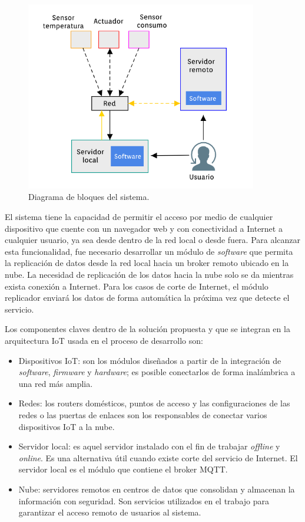 \begin{figure}[htbp]
	\centering
	\includegraphics[width=0.9\textwidth]{./Figures/bloques.png}
	\caption{Diagrama de bloques del sistema.}

	\label{fig:diagrama1}
\end{figure}

El sistema tiene la capacidad de permitir el acceso por medio de cualquier dispositivo que cuente con un navegador web y con conectividad a Internet a cualquier usuario, ya sea desde dentro de la red local o desde fuera. Para alcanzar esta funcionalidad, fue necesario desarrollar un módulo de \emph{software} que permita la replicación de datos desde la red local hacia un broker remoto ubicado en la nube. La necesidad de replicación de los datos hacia la nube solo se da mientras exista conexión a Internet. Para los casos de corte de Internet, el módulo replicador enviará los datos de forma automática la próxima vez que detecte el servicio.%

Los componentes claves dentro de la solución propuesta y que se integran en la arquitectura IoT usada en el proceso de desarrollo son: 


\begin{itemize}
\item Dispositivos IoT: son los módulos diseñados a partir de la integración de \emph{software}, \emph{firmware} y \emph{hardware}; es posible conectarlos de forma inalámbrica a una red más amplia.
\item Redes: los routers domésticos, puntos de acceso y las configuraciones de las redes o las puertas de enlaces son los responsables de conectar varios dispositivos IoT a la nube.
\item Servidor local: es aquel servidor instalado con el fin de trabajar \emph{offline} y \emph{online}. Es una alternativa útil cuando existe corte del servicio de Internet. El servidor local es el módulo que contiene el broker MQTT. 
\item Nube: servidores remotos en centros de datos que consolidan y almacenan la información con seguridad. Son servicios utilizados en el trabajo para garantizar el acceso remoto de usuarios al sistema.
\end{itemize}



